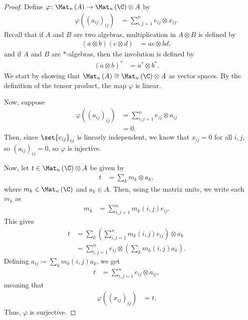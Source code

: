 \documentclass[10pt]{mypackage}
\begin{document}
\begin{proof}
  Define $\varphi\colon \Mat_n\left( A \right)\rightarrow \Mat_n\left( \C \right)\otimes A$ by
  \begin{align*}
    \varphi\left( \left( a_{ij} \right)_{ij} \right) &= \sum_{i,j=1}^{n}e_{ij}\otimes x_{ij}.
  \end{align*}
  Recall that if $A$ and $B$ are two algebras, multiplication in $A\otimes B$ is defined by
  \begin{align*}
    \left( a\otimes b \right)\left( c\otimes d \right) &= ac\otimes bd,
  \end{align*}
  and if $A$ and $B$ are $\ast$-algebras, then the involution is defined by
  \begin{align*}
    \left( a\otimes b \right)^{\ast} &= a^{\ast}\otimes b^{\ast}.
  \end{align*}
  We start by showing that $\Mat_n\left( A \right)\cong \Mat_n\left( \C \right)\otimes A$ as vector spaces. By the definition of the tensor product, the map $\varphi$ is linear.\newline

  Now, suppose
  \begin{align*}
    \varphi\left( \left( a_{ij} \right)_{ij} \right) &= \sum_{i,j=1}^{n}e_{ij}\otimes a_{ij}\\
                                                     &= 0.
  \end{align*}
  Then, since $\set{e_{ij}}_{ij}$ is linearly independent, we know that $x_{ij} = 0$ for all $i,j$, so $\left( a_{ij} \right)_{ij} = 0$, so $\varphi$ is injective.\newline

  Now, let $t\in \Mat_n\left( \C \right)\otimes A$ be given by
  \begin{align*}
    t &= \sum_{k} m_k\otimes a_k,
  \end{align*}
  where $m_k\in \Mat_n\left( \C \right)$ and $a_k\in A$. Then, using the matrix units, we write each $m_k$ as
  \begin{align*}
    m_k &= \sum_{i,j=1}^{n}m_k\left( i,j \right)e_{ij}.
  \end{align*}
  This gives
  \begin{align*}
    t &= \sum_{k}\left( \sum_{i,j=1}^{n}m_k(i,j)e_{ij} \right)\otimes a_k\\
      &= \sum_{i,j=1}^{n}e_{ij}\otimes \left( \sum_{k}m_k(i,j)a_k \right).
  \end{align*}
  Defining $a_{ij}\coloneq \sum_{k}m_{k}(i,j)a_k$, we get
  \begin{align*}
    t &= \sum_{i,j=1}^{n}e_{ij}\otimes a_{ij},
  \end{align*}
  meaning that
  \begin{align*}
    \varphi\left( \left( x_{ij} \right)_{ij} \right) &= t.
  \end{align*}
  Thus, $\varphi$ is surjective.\newline


\end{proof}
\end{document}
